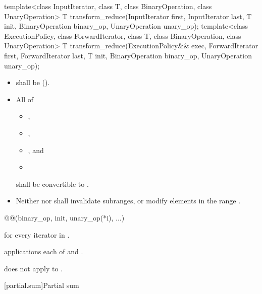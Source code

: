 %
\begin{itemdecl}
template<class InputIterator, class T,
         class BinaryOperation, class UnaryOperation>
  T transform_reduce(InputIterator first, InputIterator last, T init,
                     BinaryOperation binary_op, UnaryOperation unary_op);
template<class ExecutionPolicy,
         class ForwardIterator, class T,
         class BinaryOperation, class UnaryOperation>
  T transform_reduce(ExecutionPolicy&& exec,
                     ForwardIterator first, ForwardIterator last,
                     T init, BinaryOperation binary_op, UnaryOperation unary_op);
\end{itemdecl}

\begin{itemdescr}
\pnum
\requires
\begin{itemize}
\item
   shall be  ().
\item
  All of
  \begin{itemize}
  \item {},
  \item {},
  \item {}, and
  \item {}
  \end{itemize}
  shall be convertible to .
\item
  Neither  nor  shall invalidate subranges,
  or modify elements in the range .
\end{itemize}

\pnum
\returns
\begin{codeblock}
@@(binary_op, init, unary_op(*i), ...)
\end{codeblock}
for every iterator  in .

\pnum
\complexity
{} applications each of  and
.

\pnum
\begin{note}
 does not apply  to .
\end{note}
\end{itemdescr}

[partial.sum]{Partial sum}

